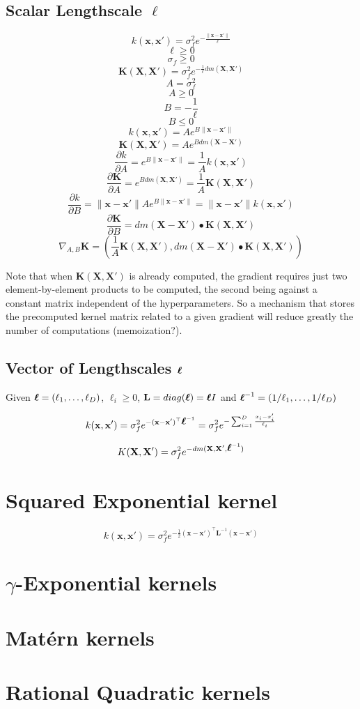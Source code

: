 \documentclass[a4paper,11pt]{article}
\newcommand\x{{\mathbf x}}
\newcommand\X{{\mathbf X}}
\newcommand\K{{\mathbf K}}
\newcommand\LL{{\mathbf L}}
\newcommand\ELL{{\Ivec \ell}}
\newcommand{\Ivec}[1]{\mbox{\boldmath $#1$}}
\begin{document}
\subsection{Scalar Lengthscale $\ell$}
$$k(\x,\x') = \sigma_f^2 e^{-\frac{\|\x-\x'\|}{\ell}}$$
$$\ell \ge 0$$
$$\sigma_f \ge 0$$
$$\K(\X,\X') = \sigma_f^2 e^{-\frac{1}{\ell}dm(\X,\X')}$$
$$A = \sigma_f^2$$
$$A \ge 0$$
$$B = -\frac{1}{\ell}$$
$$B \le 0$$
$$k(\x,\x') = A e^{B\|\x-\x'\|}$$
$$\K(\X,\X') = A e^{B dm(\X-\X')}$$
$$\frac{\partial k}{\partial A} = e^{B\|\x-\x'\|} = \frac{1}{A}k(\x,\x')$$
$$\frac{\partial \K}{\partial A} = e^{B dm(\X,\X')} = \frac{1}{A} \K(\X,\X')$$
$$\frac{\partial k}{\partial B} = \|\x-\x'\| A e^{B\|\x-\x'\|} =
\|\x-\x'\| k(\x,\x')$$
$$\frac{\partial \K}{\partial B} = dm(\X-\X') \bullet \K(\X,\X')$$
$$\nabla_{A,B} \K = (\frac{1}{A} \K(\X,\X'), dm(\X-\X') \bullet
\K(\X,\X'))$$

Note that when $\K(\X,\X')$ is already computed, the gradient requires
just two element-by-element products to be computed, the second being
against a constant matrix independent of the hyperparameters. So a
mechanism that stores the precomputed kernel matrix related to a given
gradient will reduce greatly the number of computations
(memoization?).

\subsection{Vector of Lengthscales $\Ivec{\ell}$}
Given $\Ivec{\ell} = (\ell_1,\ldots,\ell_D)$, $\ell_i \ge 0$, $\LL
= diag(\ELL) = \Ivec{\ell}I$ and $\ELL^{-1} = (1/\ell_1,\ldots,1/\ell_D)$

$$k(\x,\x') = \sigma_f^2 e^{-(\x-\x')^{\top}\ELL^{-1}} = \sigma_f^2
e^{-\sum_{i=1}^D \frac{x_i - x'_i}{\ell_i}}$$

$$K(\X,\X') = \sigma_f^2 e^{-dm(\X,\X',\ELL^{-1})}$$


\section{Squared Exponential kernel}
$$k(\x,\x') = \sigma_f^2 e^{-\frac{1}{2}(\x-\x')^{\top} \LL^{-1} (\x-\x')}$$

\section{$\gamma$-Exponential kernels}

\section{Mat\'ern kernels}

\section{Rational Quadratic kernels}
\end{document}
